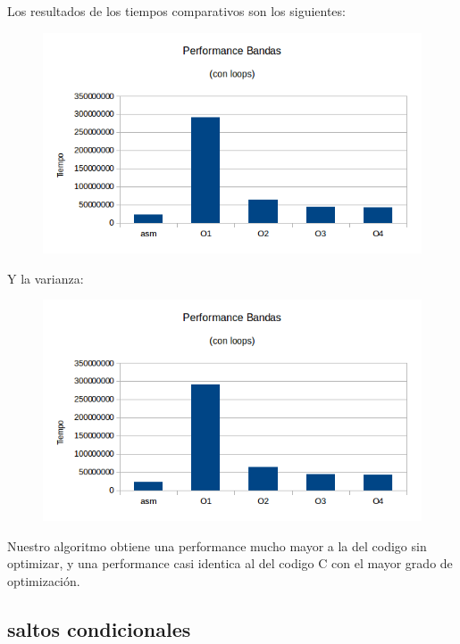 \documentclass[a4paper]{article}
\begin{document}
Los resultados de los tiempos comparativos son los siguientes:

\begin{figure}[h!]
  \begin{center}
  \includegraphics[scale=0.66]{Graficos1.4/ban/PSO.png}
  \label{nombreparareferenciar9}
  \end{center}
\end{figure}

\newpage
Y la varianza:

\begin{figure}[h!]
  \begin{center}
  \includegraphics[scale=0.66]{Graficos1.4/ban/PSO.png}
  \label{nombreparareferenciar10}
  \end{center}
\end{figure}

Nuestro algoritmo obtiene una performance mucho mayor a la del codigo sin optimizar, y una performance casi identica al del codigo C con el mayor grado de optimización.

\newpage
\subsection{saltos condicionales}
\end{document}
